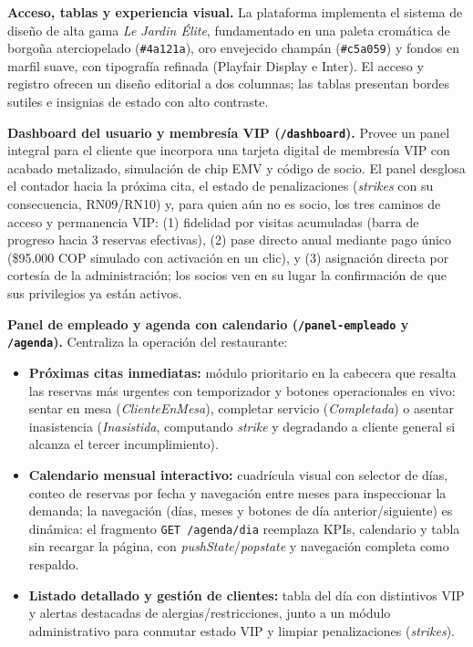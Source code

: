 \documentclass[12pt]{article}
\begin{document}
\noindent\textbf{Acceso, tablas y experiencia visual.} La plataforma implementa el sistema de diseño de alta gama \textit{Le Jardin Élite}, fundamentado en una paleta cromática de borgoña aterciopelado (\texttt{\#4a121a}), oro envejecido champán (\texttt{\#c5a059}) y fondos en marfil suave, con tipografía refinada (Playfair Display e Inter). El acceso y registro ofrecen un diseño editorial a dos columnas; las tablas presentan bordes sutiles e insignias de estado con alto contraste.

\noindent\textbf{Dashboard del usuario y membresía VIP (\texttt{/dashboard}).} Provee un panel integral para el cliente que incorpora una tarjeta digital de membresía VIP con acabado metalizado, simulación de chip EMV y código de socio. El panel desglosa el contador hacia la próxima cita, el estado de penalizaciones (\textit{strikes} con su consecuencia, RN09/RN10) y, para quien aún no es socio, los tres caminos de acceso y permanencia VIP: (1) fidelidad por visitas acumuladas (barra de progreso hacia 3 reservas efectivas), (2) pase directo anual mediante pago único (\$95.000 COP simulado con activación en un clic), y (3) asignación directa por cortesía de la administración; los socios ven en su lugar la confirmación de que sus privilegios ya están activos.

\noindent\textbf{Panel de empleado y agenda con calendario (\texttt{/panel-empleado} y \texttt{/agenda}).} Centraliza la operación del restaurante:
\begin{itemize}
  \item \textbf{Próximas citas inmediatas:} módulo prioritario en la cabecera que resalta las reservas más urgentes con temporizador y botones operacionales en vivo: sentar en mesa (\textit{ClienteEnMesa}), completar servicio (\textit{Completada}) o asentar inasistencia (\textit{Inasistida}, computando \textit{strike} y degradando a cliente general si alcanza el tercer incumplimiento).
  \item \textbf{Calendario mensual interactivo:} cuadrícula visual con selector de días, conteo de reservas por fecha y navegación entre meses para inspeccionar la demanda; la navegación (días, meses y botones de día anterior/siguiente) es dinámica: el fragmento \texttt{GET /agenda/dia} reemplaza KPIs, calendario y tabla sin recargar la página, con \textit{pushState}/\textit{popstate} y navegación completa como respaldo.
  \item \textbf{Listado detallado y gestión de clientes:} tabla del día con distintivos VIP y alertas destacadas de alergias/restricciones, junto a un módulo administrativo para conmutar estado VIP y limpiar penalizaciones (\textit{strikes}).
\end{itemize}
\end{document}
